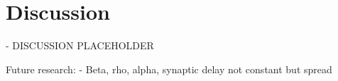 \chapter{Discussion}\label{ch:discussion}


\begin{tcolorbox}[colback=orange]
- DISCUSSION PLACEHOLDER
\end{tcolorbox}


\begin{tcolorbox}[colback=orange]
Future research:
- Beta, rho, alpha, synaptic delay not constant but spread
\end{tcolorbox}
